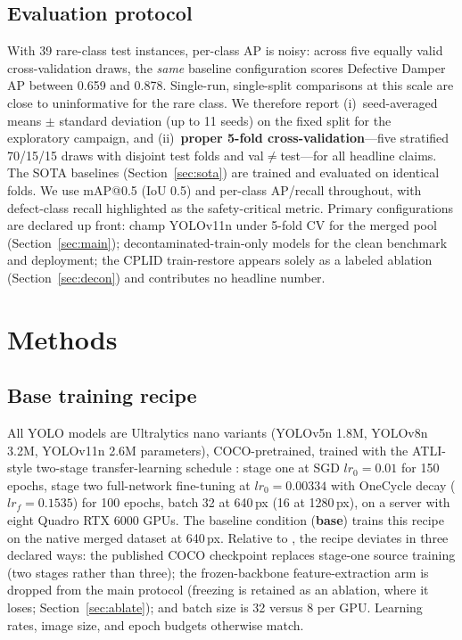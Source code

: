 \documentclass[conference]{IEEEtran}
\makeatletter
\newcommand{\dd}{Defective Damper}
\newcommand{\map}{mAP@0.5}
\makeatother
\begin{document}
\subsection{Evaluation protocol}
\label{sec:protocol}
With 39 rare-class test instances, per-class AP is noisy: across five equally valid cross-validation draws, the \emph{same} baseline configuration scores \dd{} AP between 0.659 and 0.878. Single-run, single-split comparisons at this scale are close to uninformative for the rare class. We therefore report (i)~seed-averaged means $\pm$ standard deviation (up to 11 seeds) on the fixed split for the exploratory campaign, and (ii)~\textbf{proper 5-fold cross-validation}---five stratified 70/15/15 draws with disjoint test folds and val${}\neq{}$test---for all headline claims. The SOTA baselines (Section~\ref{sec:sota}) are trained and evaluated on identical folds. We use \map{} (IoU 0.5) and per-class AP/recall throughout, with defect-class recall highlighted as the safety-critical metric. Primary configurations are declared up front: champ YOLOv11n under 5-fold CV for the merged pool (Section~\ref{sec:main}); decontaminated-train-only models for the clean benchmark and deployment; the CPLID train-restore appears solely as a labeled ablation (Section~\ref{sec:decon}) and contributes no headline number.

\section{Methods}
\label{sec:methods}

\subsection{Base training recipe}
All YOLO models are Ultralytics nano variants \cite{jocher2023ultralytics} (YOLOv5n 1.8M, YOLOv8n 3.2M, YOLOv11n 2.6M parameters), COCO-pretrained, trained with the ATLI-style two-stage transfer-learning schedule \cite{tsai2025atli}: stage one at SGD $lr_0{=}0.01$ for 150 epochs, stage two full-network fine-tuning at $lr_0{=}0.00334$ with OneCycle decay ($lr_f{=}0.1535$) for 100 epochs, batch 32 at 640\,px (16 at 1280\,px), on a server with eight Quadro RTX 6000 GPUs. The baseline condition (\textbf{base}) trains this recipe on the native merged dataset at 640\,px. Relative to \cite{tsai2025atli}, the recipe deviates in three declared ways: the published COCO checkpoint replaces stage-one source training (two stages rather than three); the frozen-backbone feature-extraction arm is dropped from the main protocol (freezing is retained as an ablation, where it loses; Section~\ref{sec:ablate}); and batch size is 32 versus 8 per GPU. Learning rates, image size, and epoch budgets otherwise match.
\end{document}
